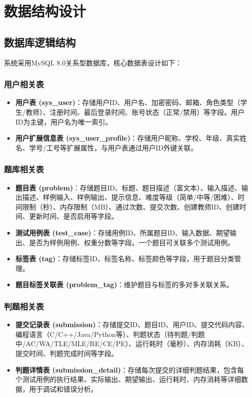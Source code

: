 \documentclass{../template/softeng}
\begin{document}
\section{数据结构设计}

\subsection{数据库逻辑结构}
系统采用MySQL 8.0关系型数据库，核心数据表设计如下：

\subsubsection{用户相关表}
\begin{itemize}
	\item \textbf{用户表 (sys\_user)}：存储用户ID、用户名、加密密码、邮箱、角色类型（学生/教师）、注册时间、最后登录时间、账号状态（正常/禁用）等字段。用户ID为主键，用户名为唯一索引。
	\item \textbf{用户扩展信息表 (sys\_user\_profile)}：存储用户昵称、学校、年级、真实姓名、学号/工号等扩展属性，与用户表通过用户ID外键关联。
\end{itemize}

\subsubsection{题库相关表}
\begin{itemize}
	\item \textbf{题目表 (problem)}：存储题目ID、标题、题目描述（富文本）、输入描述、输出描述、样例输入、样例输出、提示信息、难度等级（简单/中等/困难）、时间限制（秒）、内存限制（MB）、通过次数、提交次数、创建教师ID、创建时间、更新时间、是否启用等字段。
	\item \textbf{测试用例表 (test\_case)}：存储用例ID、所属题目ID、输入数据、期望输出、是否为样例用例、权重分数等字段。一个题目可关联多个测试用例。
	\item \textbf{标签表 (tag)}：存储标签ID、标签名称、标签颜色等字段，用于题目分类管理。
	\item \textbf{题目标签关联表 (problem\_tag)}：维护题目与标签的多对多关联关系。
\end{itemize}

\subsubsection{判题相关表}
\begin{itemize}
	\item \textbf{提交记录表 (submission)}：存储提交ID、题目ID、用户ID、提交代码内容、编程语言（C/C++/Java/Python等）、判题状态（待判题/判题中/AC/WA/TLE/MLE/RE/CE/PE）、运行耗时（毫秒）、内存消耗（KB）、提交时间、判题完成时间等字段。
	\item \textbf{判题详情表 (submission\_detail)}：存储每次提交的详细判题结果，包含每个测试用例的执行结果、实际输出、期望输出、运行耗时、内存消耗等详细数据，用于调试和错误分析。
\end{itemize}
\end{document}

